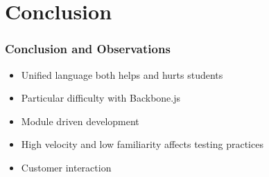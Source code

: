 \documentclass{beamer}
\begin{document}
\section{Conclusion}
\begin{frame}[fragile]
\frametitle{Conclusion and Observations}
	\begin{itemize}
  	 \item Unified language both helps and hurts students
	 \item Particular difficulty with Backbone.js
  	 \item Module driven development
	 \item High velocity and low familiarity affects testing practices
  	 \item Customer interaction
	\end{itemize}
\end{frame}
\end{document}
